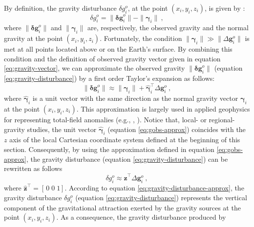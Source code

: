 \documentclass[manuscript]{geophysics}
\begin{document}
By definition, the gravity disturbance $\delta g^{o}_{i}$,
at the point $(x_{i}, y_{i}, z_{i})$, is given by \citep{hofmann-wellenhof-moritz2005}:
\begin{equation}
\delta g^{o}_{i} =  \| \mathbf{\delta g}^{o}_{i} \| - \| \boldsymbol{\gamma}_{i} \| \: ,
\label{eq:gravity-disturbance}
\end{equation}
where $\| \mathbf{\delta g}^{o}_{i} \|$ and $\| \boldsymbol{\gamma}_{i} \|$ are,
respectively, the observed gravity and the normal gravity at the
point $(x_{i}, y_{i}, z_{i})$.
Fortunately, the condition $\| \boldsymbol{\gamma}_{i} \| \gg \| \Delta \mathbf{g}^{o}_{i} \|$
is met at all points located above or on the Earth's surface.
By combining this condition and the definition of observed gravity vector
given in equation \ref{eq:gravity-vector}, we can approximate the observed gravity
$\| \mathbf{\delta g}^{o}_{i} \|$ (equation \ref{eq:gravity-disturbance})
by a first order Taylor's expansion as follows:
\begin{equation}
\| \mathbf{\delta g}^{o}_{i} \| \approx \| \boldsymbol{\gamma}_{i} \| + 
\hat{\boldsymbol{\gamma}}_{i}^{\top} \Delta \mathbf{g}^{o}_{i} \: ,
\label{eq:gobs-approx}
\end{equation}
where $\hat{\boldsymbol{\gamma}}_{i}$ is a unit vector with the same 
direction as the normal gravity vector $\boldsymbol{\gamma}_{i}$ at
the point $(x_{i}, y_{i}, z_{i})$.
This approximation is largely used in applied geophysics for representing
total-field anomalies (e.g., \citeauthor{blakely1996}, \citeyear{blakely1996}).
Notice that, local- or regional-gravity studies, the unit
vector $\hat{\boldsymbol{\gamma}}_{i}$ (equation \ref{eq:gobs-approx}) 
coincides with the $z$ axis
of the local Cartesian coordinate system defined
at the beginning of this section. Consequently,
by using the approximation defined in equation \ref{eq:gobs-approx}, 
the gravity disturbance (equation \ref{eq:gravity-disturbance}) can be 
rewritten as follows \begin{equation}
\delta g^{o}_{i} \approx \hat{\mathbf{z}}^{\top} \Delta \mathbf{g}^{o}_{i} \: ,
\label{eq:gravity-disturbance-approx}
\end{equation}
where $\hat{\mathbf{z}}^{\top} = \left[ \, 0 \; 0 \; 1 \right]$.
According to equation \ref{eq:gravity-disturbance-approx},
the gravity disturbance $\delta g^{o}_{i}$ (equation \ref{eq:gravity-disturbance})
represents the vertical component of the gravitational attraction exerted by
the gravity sources at the point $(x_{i}, y_{i}, z_{i})$.
As a consequence, the gravity disturbance produced by
\end{document}
